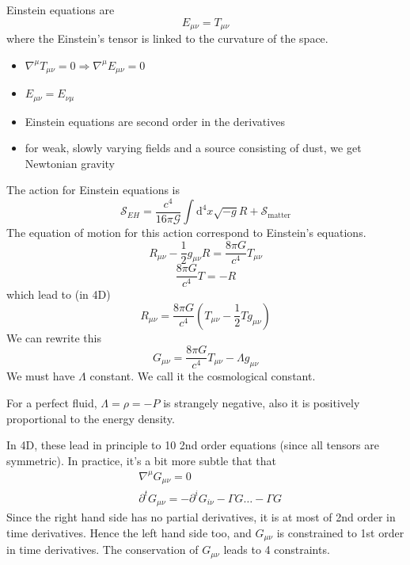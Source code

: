 \documentclass[a4paper]{book}
\theoremstyle{definition}
\theoremstyle{remark}
\begin{document}
Einstein equations are 
\begin{equation}
    E_{\mu\nu} = T_{\mu\nu}
\end{equation}
where the Einstein's tensor is linked to the curvature of the space. 
\begin{itemize}
    \item $\nabla^\mu T_{\mu\nu} = 0 \Rightarrow \nabla^\mu E_{\mu\nu} = 0$
    \item $E_{\mu\nu} = E_{\nu\mu}$
    \item Einstein equations are second order in the derivatives 
    \item for weak, slowly varying fields and a source consisting of dust, we get Newtonian gravity
\end{itemize}
The action for Einstein equations is 
\begin{equation}
    \mathcal{S}_{EH} = \frac{c^4}{16\pi \mathcal{G}}\int \text{d}^4 x \sqrt{-g}R + \mathcal{S}_{\text{matter}}
\end{equation}
The equation of motion for this action correspond to Einstein's equations. 
\begin{equation}
    R_{\mu\nu} - \frac{1}{2}g_{\mu\nu}R = \frac{8\pi G}{c^4}T_{\mu\nu}
\end{equation}
\begin{equation}
    \frac{8\pi G}{c^4}T = -R
\end{equation}
which lead to (in 4D)
\begin{equation}
    R_{\mu\nu} = \frac{8\pi G}{c^4}(T_{\mu\nu} - \frac{1}{2}Tg_{\mu\nu})
\end{equation}
We can rewrite this 
\begin{equation}
    G_{\mu\nu} = \frac{8\pi G}{c^4} T_{\mu\nu} - \Lambda g_{\mu\nu}
\end{equation}
We must have $\Lambda$ constant. We call it the cosmological constant. \par \medskip 

For a perfect fluid, $\Lambda = \rho = -P$ is strangely negative, also it is positively proportional to the energy density. \par \medskip 

In 4D, these lead in principle to 10 2nd order equations (since all tensors are symmetric). In practice, it's a bit more subtle that that 
\begin{equation}
    \begin{aligned}
        &\nabla^\mu G_{\mu\nu} = 0 \\
        &\partial^t G_{\mu\nu} = -\partial^iG_{i\nu} - \Gamma G \dots - \Gamma G
    \end{aligned}
\end{equation}
Since the right hand side has no partial derivatives, it is at most of 2nd order in time derivatives. Hence the left hand side too, and $G_{\mu\nu}$ is constrained to 1st order in time derivatives. The conservation of $G_{\mu\nu}$ leads to 4 constraints.  \par \medskip 
\end{document}
